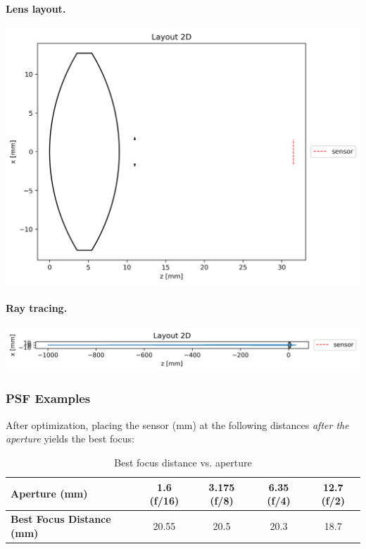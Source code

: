 \documentclass[11pt,a4paper]{article}
\newcommand{\pandocbounded}[1]{#1}
\begin{document}
	\paragraph{Lens layout.}%
	\pandocbounded{\includegraphics[width=\linewidth,keepaspectratio]{biconvex_layout.png}}
	
	\paragraph{Ray tracing.}%
	\pandocbounded{\includegraphics[width=\linewidth,keepaspectratio]{biconvex_rays.png}}
	
	\subsubsection*{PSF Examples}\label{psf-examples}
	
	After optimization, placing the sensor (mm) at the following distances \emph{after the aperture} yields the best focus:
	
	\begin{table}[H]
		\centering
		\caption{Best focus distance vs. aperture}
		\begin{tabular}{lcccc}
			\toprule
			\textbf{Aperture (mm)} & \textbf{1.6 (f/16)} & \textbf{3.175 (f/8)} & \textbf{6.35 (f/4)} & \textbf{12.7 (f/2)} \\
			\midrule
			\textbf{Best Focus Distance (mm)} & 20.55 & 20.5 & 20.3 & 18.7 \\
			\bottomrule
		\end{tabular}
	\end{table}
	
\end{document}
